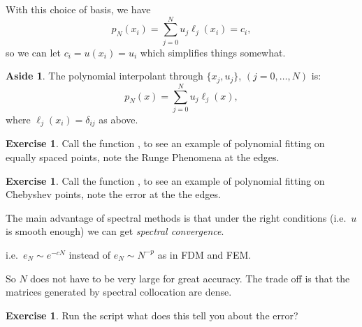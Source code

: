 \documentclass[12pt, a4paper]{article}
\theoremstyle{definition}
\newtheorem{exercise}[thm]{Exercise}
\newtheorem*{aside}{Aside}
\theoremstyle{remark}
\numberwithin{equation}{section}
\begin{document}
\begin{enumerate}
\begin{itemize}
With this choice of basis, we have
\begin{equation*}
p_N(x_i) = \sum_{j=0}^{N}u_j\ell_j(x_i) =  c_i,
\end{equation*}
so we can let $c_i=u(x_i)=u_i$ which simplifies things somewhat.
\end{itemize}
\end{enumerate}
\begin{aside}
The polynomial interpolant through $\{x_j,u_j\}$, $(j=0,\dots,N)$ is:
\begin{equation*}
p_N(x) = \sum_{j=0}^{N}u_j\ell_j(x),
\end{equation*}
where $\ell_j(x_i)=\delta_{ij}$ as above.
\end{aside}

\begin{exercise}
Call the function , to see an example of polynomial fitting on equally spaced points, note the Runge Phenomena at the edges.
\end{exercise}

\begin{exercise}
Call the function , to see an example of polynomial fitting on Chebyshev points, note the error at the  the edges. 
\end{exercise}

The main advantage of spectral methods is that under the right conditions (i.e.\ $u$ is smooth enough) we can get \emph{spectral convergence}.

i.e.\ $e_N \sim e^{-cN}$ instead of $e_N \sim N^{-p}$ as in FDM and FEM.

So $N$ does not have to be very large for great accuracy. The trade off is that the matrices generated by spectral collocation are dense.

\begin{exercise}
Run the script  what does this tell you about the error?
\end{exercise}
\end{document}
